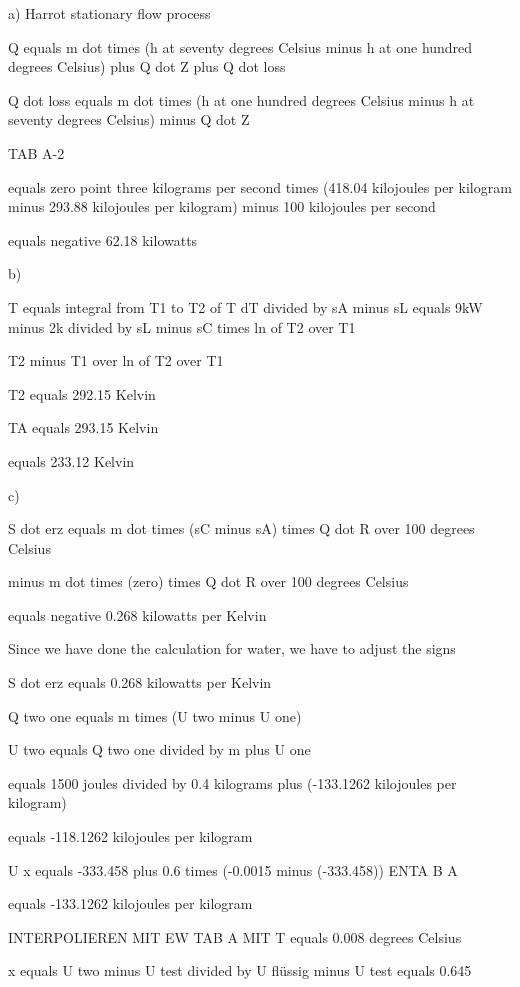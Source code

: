 a) Harrot stationary flow process

Q equals m dot times (h at seventy degrees Celsius minus h at one hundred degrees Celsius) plus Q dot Z plus Q dot loss

Q dot loss equals m dot times (h at one hundred degrees Celsius minus h at seventy degrees Celsius) minus Q dot Z

TAB A-2

equals zero point three kilograms per second times (418.04 kilojoules per kilogram minus 293.88 kilojoules per kilogram) minus 100 kilojoules per second

equals negative 62.18 kilowatts

b)

T equals integral from T1 to T2 of T dT divided by sA minus sL equals 9kW minus 2k divided by sL minus sC times ln of T2 over T1

T2 minus T1 over ln of T2 over T1

T2 equals 292.15 Kelvin

TA equals 293.15 Kelvin

equals 233.12 Kelvin

c)

S dot erz equals m dot times (sC minus sA) times Q dot R over 100 degrees Celsius

minus m dot times (zero) times Q dot R over 100 degrees Celsius

equals negative 0.268 kilowatts per Kelvin

Since we have done the calculation for water, we have to adjust the signs

S dot erz equals 0.268 kilowatts per Kelvin

Q two one equals m times (U two minus U one)

U two equals Q two one divided by m plus U one

equals 1500 joules divided by 0.4 kilograms plus (-133.1262 kilojoules per kilogram)

equals -118.1262 kilojoules per kilogram

U x equals -333.458 plus 0.6 times (-0.0015 minus (-333.458)) ENTA B A

equals -133.1262 kilojoules per kilogram

INTERPOLIEREN MIT EW TAB A MIT T equals 0.008 degrees Celsius

x equals U two minus U test divided by U flüssig minus U test equals 0.645